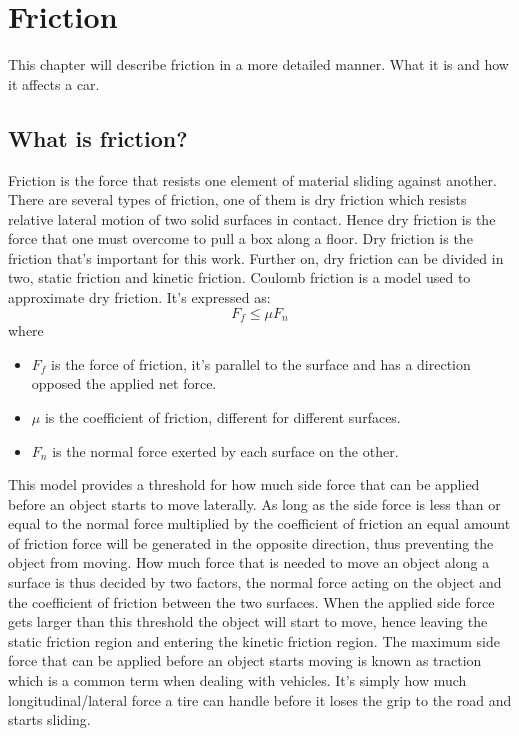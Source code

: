 \chapter{Friction}
This chapter will describe friction in a more detailed manner. What it is and how it affects a car.

\section{What is friction?}
Friction is the force that resists one element of material sliding against another. There are several types of friction, one of them is dry friction which resists relative lateral motion of two solid surfaces in contact. Hence dry friction is the force that one must overcome to pull a box along a floor. Dry friction is the friction that's important for this work. Further on, dry friction can be divided in two, static friction and kinetic friction. Coulomb friction is a model used to approximate dry friction. It's expressed as:
\begin{equation} \label{eq:friction}
F_{f}\leq\mu F_{n}
\end{equation}
where
\begin{itemize}
	\item $ F_{f} $ is the force of friction, it's parallel to the surface and has a direction opposed the applied net force.
	\item $ \mu $ is the coefficient of friction, different for different surfaces.
	\item $ F_{n} $ is the normal force exerted by each surface on the other.
\end{itemize}
This model provides a threshold for how much side force that can be applied before an object starts to move laterally. As long as the side force is less than or equal to the normal force multiplied by the coefficient of friction an equal amount of friction force will be generated in the opposite direction, thus preventing the object from moving. How much force that is needed to move an object along a surface is thus decided by two factors, the normal force acting on the object and the coefficient of friction between the two surfaces. When the applied side force gets larger than this threshold the object will start to move, hence leaving the static friction region and entering the kinetic friction region. The maximum side force that can be applied before an object starts moving is known as traction which is a common term when dealing with vehicles. It's simply how much longitudinal/lateral force a tire can handle before it loses the grip to the road and starts sliding.

